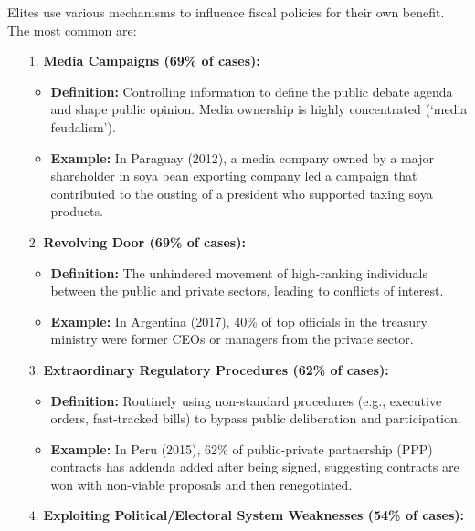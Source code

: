 \documentclass{article}
\begin{document}
    \noindent Elites use various mechanisms to influence fiscal policies for
their own benefit. The most common are:
    \begin{itemize}
        \item [$1$.] \textbf{Media Campaigns (69\% of cases):}
        \begin{itemize}
            \item \textbf{Definition:} Controlling information to define the
            public debate agenda and shape public opinion. Media ownership
            is highly concentrated (`media feudalism').
            \item \textbf{Example:} In Paraguay (2012), a media company
            owned by a major shareholder in soya bean exporting company led
            a campaign that contributed to the ousting of a president who
            supported taxing soya products.
        \end{itemize}
        \item[$2$.] \textbf{Revolving Door (69\% of cases):}
        \begin{itemize}
            \item \textbf{Definition:} The unhindered movement of
            high-ranking individuals between the public and private sectors,
            leading to conflicts of interest.
            \item \textbf{Example:} In Argentina (2017), 40\% of top
            officials in the treasury ministry were former CEOs or managers
            from the private sector.
        \end{itemize}
        \item[$3$.]
        \textbf{Extraordinary Regulatory Procedures (62\% of cases):}
        \begin{itemize}
            \item \textbf{Definition:} Routinely using non-standard
            procedures (e.g., executive orders, fast-tracked bills) to
            bypass public deliberation and participation.
            \item \textbf{Example:} In Peru (2015), 62\% of public-private
            partnership (PPP) contracts has addenda added after being
            signed, suggesting contracts are won with non-viable proposals
            and then renegotiated.
        \end{itemize}
        \item[$4$.]
        \textbf{Exploiting Political/Electoral System Weaknesses (54\% of cases):}
        \begin{itemize}

\end{itemize}
\end{itemize}
\end{document}
